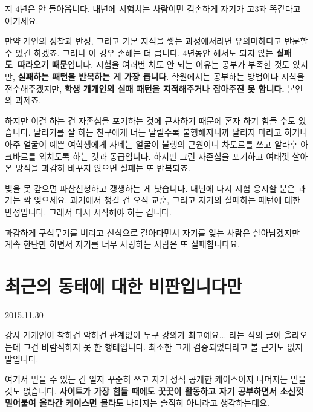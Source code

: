 저 4년은 안 돌아옵니다.
내년에 시험치는 사람이면 겸손하게 자기가 고3과 똑같다고 여기세요.
\vspace{5mm}

만약 개인의 성찰과 반성, 그리고 기본 지식을 쌓는 과정에서라면 유의미하다고 반문할 수 있긴 하겠죠.
그러나 이 경우 손해는 더 큽니다. 4년동안 해서도 되지 않는 \textbf{실패도 따라오기 때문}입니다.
시험을 여러번 쳐도 안 되는 이유는 공부가 부족한 것도 있지만, \textbf{실패하는 패턴을 반복하는 게 가장 큽니다}.
학원에서는 공부하는 방법이나 지식을 전수해주겠지만, \textbf{학생 개개인의 실패 패턴을 지적해주거나 잡아주진 못 합니다.}
본인의 과제죠.
\vspace{5mm}

하지만 이걸 하는 건 자존심을 포기하는 것에 근사하기 때문에 혼자 하기 힘들 수도 있습니다.
달리기를 잘 하는 친구에게 너는 달릴수록 불행해지니까 달리지 마라고 하거나
아주 얼굴이 예쁜 여학생에게 자네는 얼굴이 불행의 근원이니 차도르를 쓰고 알라후 아크바르를 외치도록 하는 것과 동급입니다.
하지만 그런 자존심을 포기하고 여태껏 살아온 방식을 과감히 바꾸지 않으면 실패는 또 반복되죠.
\vspace{5mm}

빚을 못 갚으면 파산신청하고 갱생하는 게 낫습니다.
내년에 다시 시험 응시할 분은 과거는 싹 잊으세요. 과거에서 챙길 건 오직 교훈, 그리고 자기의 실패하는 패턴에 대한 반성입니다.
그래서 다시 시작해야 하는 겁니다.
\vspace{5mm}

과감하게 구식무기를 버리고 신식으로 갈아타면서 자기를 잊는 사람은 살아남겠지만
계속 한탄만 하면서 자기를 너무 사랑하는 사람은 또 실패합니다요.
\vspace{5mm}




\section{최근의 동태에 대한 비판입니다만}
\href{https://www.kockoc.com/Apoc/518822}{2015.11.30}

\vspace{5mm}

강사 개개인이 착하건 악하건 관계없이
누구 강의가 최고예요... 라는 식의 글이 올라오는데 그건 바람직하지 못 한 행태입니다.
최소한 그게 검증되었다라고 볼 근거도 없지 말입니다.
\vspace{5mm}

여기서 믿을 수 있는 건 일지 꾸준히 쓰고 자기 성적 공개한 케이스이지
나머지는 믿을 것도 없습니다.
\textbf{사이트가 가장 힘들 때에도 꿋꿋이 활동하고 자기 공부하면서 소신껏 밀어붙여 올라간 케이스면 몰라도}
나머지는 솔직히 아니라고 생각하는데요.
\vspace{5mm}

